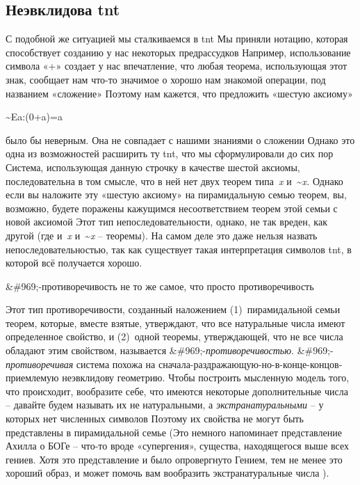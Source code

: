 \documentclass[../main.tex]{subfiles}
\begin{document}
\subsection{Неэвклидова \acs{tnt}}

С подобной же ситуацией мы сталкиваемся в \acs{tnt} Мы приняли нотацию, которая способствует созданию у нас некоторых предрассудков Например, использование символа «+» создает у нас впечатление, что любая теорема, использующая этот знак, сообщает нам что-то значимое о хорошо нам знакомой операции, под названием «сложение» Поэтому нам кажется, что предложить «шестую аксиому»

\textasciitilde Ea:(0+a)=a

было бы неверным. Она не совпадает с нашими знаниями о сложении Однако это одна из возможностей расширить ту \acs{tnt}, что мы сформулировали до сих пор Система, использующая данную строчку в качестве шестой аксиомы, последовательна в том смысле, что в ней нет двух теорем типа~\emph{x} и~\textasciitilde{}\emph{x.} Однако если вы наложите эту «шестую аксиому» на пирамидальную семью теорем, вы, возможно, будете поражены кажущимся несоответствием теорем этой семьи с новой аксиомой Этот тип непоследовательности, однако, не так вреден, как другой (где и~\emph{x} и~\textasciitilde{}\emph{x} \--- теоремы). На самом деле это даже нельзя назвать непоследовательностью, так как существует такая интерпретация символов \acs{tnt}, в которой всё получается хорошо.

\&\#969;-противоречивость не то же самое, что просто противоречивость

Этот тип противоречивости, созданный наложением (1)~пирамидальной семьи теорем, которые, вместе взятые, утверждают, что все натуральные числа имеют определенное свойство, и (2)~одной теоремы, утверждающей, что не все числа обладают этим свойством, называется \&\#969;-\emph{противоречивостью}. \&\#969;-\emph{противоречивая} система похожа на сначала-раздражающую-но-в-конце-концов-приемлемую неэвклидову геометрию. Чтобы построить мысленную модель того, что происходит, вообразите себе, что имеются некоторые дополнительные числа \--- давайте будем называть их не натуральными, а \emph{экстранатуральными} \--- у которых нет численных символов Поэтому их свойства не могут быть представлены в пирамидальной семье (Это немного напоминает представление Ахилла о БОГе \--- что-то вроде «супергения», существа, находящегося выше всех гениев. Хотя это представление и было опровергнуто Гением, тем не менее это хороший образ, и может помочь вам вообразить экстранатуральные числа ).
\end{document}
